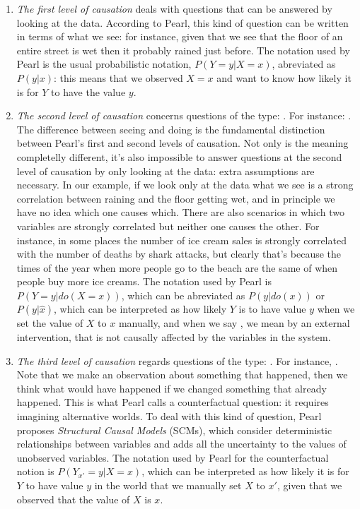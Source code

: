 \begin{enumerate}
\item \emph{The first level of causation} deals with questions that can be answered by looking at the data.  According to Pearl, this kind of question can be written in terms of what we see: for instance, given that we see that the floor of an entire street is wet then it probably rained just before. The notation used by Pearl is the usual probabilistic notation, $P(Y=y|X=x)$, abreviated as $P(y|x)$: this means that we observed $X=x$ and want to know how likely it is for $Y$ to have the value $y$.
\item \emph{The second level of causation} concerns questions of the type: . For instance: . The difference between seeing and doing is the fundamental distinction between Pearl's first and second levels of causation. Not only is the meaning completelly different, it's also impossible to answer questions at the second level of causation by only looking at the data: extra assumptions are necessary. In our example, if we look only at the data what we see is a strong correlation between raining and the floor getting wet, and in principle we have no idea which one causes which. There are also scenarios in which two variables are strongly correlated but neither one causes the other. For instance, in some places the number of ice cream sales is strongly correlated with the number of deaths by  shark attacks, but clearly that's because the times of the year when more people go to the beach are the same of when people buy more ice creams. The notation used by Pearl is $P(Y=y|do(X=x))$, which can be abreviated as $P(y|do(x))$ or $P(y|\hat{x})$, which can be interpreted as how likely $Y$ is to have value $y$ when we set the value of $X$ to $x$ manually, and when we say , we mean by an external intervention, that is not causally affected by the variables in the system. 
\item \emph{The third level of causation} regards questions of the type: . For instance, . Note that we make an observation about something that happened, then we think what would have happened if we changed something that already happened. This is what Pearl calls a counterfactual question: it requires imagining alternative worlds. To deal with this kind of question, Pearl proposes \emph{Structural Causal Models} (SCMs), which consider deterministic relationships between variables and adds all the uncertainty to the values of unobserved variables. The notation used by Pearl for the counterfactual notion is $P(Y_{x'} = y| X=x)$, which can be interpreted as how likely it is for $Y$ to have value $y$ in the world that we manually set $X$ to $x'$, given that we observed that the value of $X$ is $x$. 
\end{enumerate}

